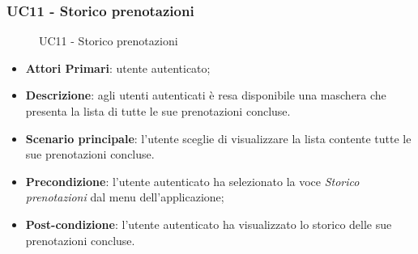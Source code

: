 \subsubsection{UC11 - Storico prenotazioni}
 \begin{figure}[h]
	\centering
	\caption{UC11 - Storico prenotazioni}
\end{figure}
\begin{itemize}
	\item \textbf{Attori Primari}: utente autenticato;
	\item \textbf{Descrizione}: agli utenti autenticati è resa disponibile una maschera che presenta la lista di tutte le sue prenotazioni concluse. 
	\item \textbf{Scenario principale}: l'utente sceglie di visualizzare la lista contente tutte le sue prenotazioni concluse.
	\item \textbf{Precondizione}: l'utente autenticato ha selezionato la voce \textit{Storico prenotazioni} dal menu dell'applicazione;
	\item \textbf{Post-condizione}: l'utente autenticato ha visualizzato lo storico delle sue prenotazioni concluse. 
\end{itemize} 
